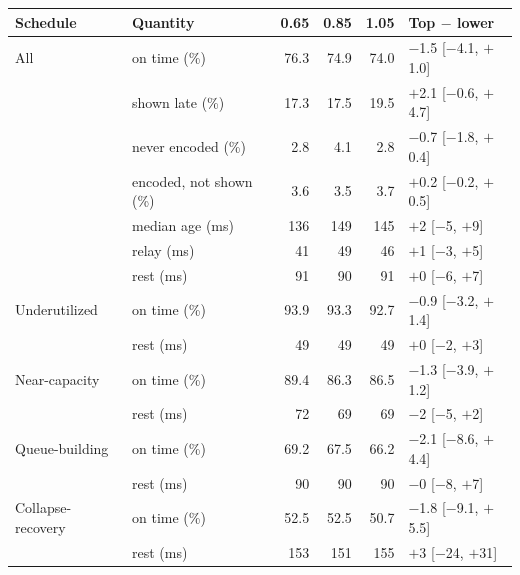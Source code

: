 \begin{tabular}{llrrrl}
\toprule
Schedule & Quantity & 0.65 & 0.85 & 1.05 & Top $-$ lower \\
\midrule
All & on time (\%) & 76.3 & 74.9 & 74.0 & $-$1.5 [$-$4.1, $+$1.0] \\
 & shown late (\%) & 17.3 & 17.5 & 19.5 & $+$2.1 [$-$0.6, $+$4.7] \\
 & never encoded (\%) & 2.8 & 4.1 & 2.8 & $-$0.7 [$-$1.8, $+$0.4] \\
 & encoded, not shown (\%) & 3.6 & 3.5 & 3.7 & $+$0.2 [$-$0.2, $+$0.5] \\
 & median age (ms) & 136 & 149 & 145 & $+$2 [$-$5, $+$9] \\
 & relay (ms) & 41 & 49 & 46 & $+$1 [$-$3, $+$5] \\
 & rest (ms) & 91 & 90 & 91 & $+$0 [$-$6, $+$7] \\
\midrule
Underutilized & on time (\%) & 93.9 & 93.3 & 92.7 & $-$0.9 [$-$3.2, $+$1.4] \\
 & rest (ms) & 49 & 49 & 49 & $+$0 [$-$2, $+$3] \\
Near-capacity & on time (\%) & 89.4 & 86.3 & 86.5 & $-$1.3 [$-$3.9, $+$1.2] \\
 & rest (ms) & 72 & 69 & 69 & $-$2 [$-$5, $+$2] \\
Queue-building & on time (\%) & 69.2 & 67.5 & 66.2 & $-$2.1 [$-$8.6, $+$4.4] \\
 & rest (ms) & 90 & 90 & 90 & $-$0 [$-$8, $+$7] \\
Collapse-recovery & on time (\%) & 52.5 & 52.5 & 50.7 & $-$1.8 [$-$9.1, $+$5.5] \\
 & rest (ms) & 153 & 151 & 155 & $+$3 [$-$24, $+$31] \\
\bottomrule
\end{tabular}
